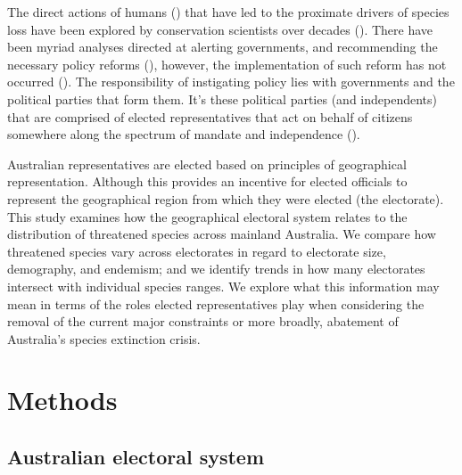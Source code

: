 \documentclass[a4paper,11pt]{article}
\begin{document}
The direct actions of humans (\cite{rydenLinkingDemocracyBiodiversity2020,dalbyAnthropoceneFormationsEnvironmental2017,burkeSpeciesBordersPolitical2020}) that have led to the proximate drivers of species loss have been explored by conservation scientists over decades (\cite{kearneyThreatsAustraliaImperilled2019,allekThreatsEndangeringAustralia2018}). There have been myriad analyses directed at alerting governments, and recommending the necessary policy reforms (\cite{hawkeReportIndependentReview2009,samuelIndependentReviewEPBC2020,mcdonaldImprovingPolicyEfficiency2015}), however, the implementation of such reform has not occurred (\cite{woinarskiContributionPolicyLaw2017,resideHowSendFinch2019}). The responsibility of instigating policy lies with governments and the political parties that form them. It's these political parties (and independents) that are comprised of elected representatives that act on behalf of citizens somewhere along the spectrum of mandate and independence (\cite{pitkinConceptRepresentation1972,rohrschneiderIntroductionPoliticalRepresentation2020}).

Australian representatives are elected based on principles of geographical representation. Although this provides an incentive for elected officials to represent the geographical region from which they were elected (the electorate). This study examines how the geographical electoral system relates to the distribution of threatened species across mainland Australia. We compare how threatened species vary across electorates in regard to electorate size, demography, and endemism; and we identify trends in how many electorates intersect with individual species ranges. We explore what this information may mean in terms of the roles elected representatives play when considering the removal of the current major constraints or more broadly, abatement of Australia's species extinction crisis.

\section{Methods}

\subsection{Australian electoral system}
\end{document}
